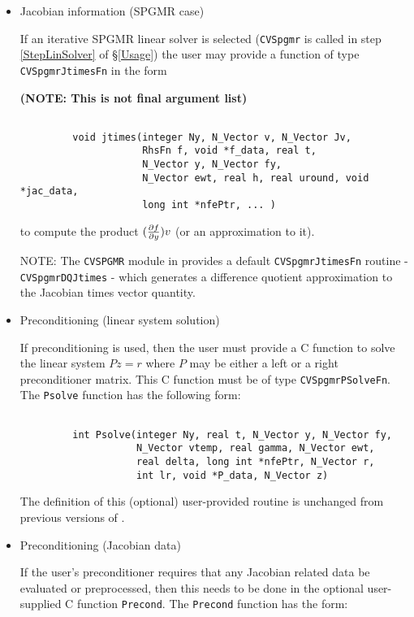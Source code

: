 \begin{itemize}
\item Jacobian information (SPGMR case)

If an iterative SPGMR linear solver is selected ({\tt CVSpgmr} is called in step 
\ref{StepLinSolver} of \S\ref{Usage}) the user may provide a function
of type {\tt CVSpgmrJtimesFn} in the form 

{\bf (NOTE: This is not final argument list)}

\begin{verbatim}

         void jtimes(integer Ny, N_Vector v, N_Vector Jv,
                     RhsFn f, void *f_data, real t, 
                     N_Vector y, N_Vector fy,
                     N_Vector ewt, real h, real uround, void *jac_data,
                     long int *nfePtr, ... )

\end{verbatim} 
to compute the product $(\frac{\partial f}{\partial y}) v$ (or an approximation to it).

NOTE: The {\tt CVSPGMR} module in {\codeS} provides a default 
{\tt CVSpgmrJtimesFn} routine - {\tt CVSpgmrDQJtimes} - which generates a
difference quotient approximation to the Jacobian times vector quantity.

\item Preconditioning (linear system solution) 

If preconditioning is used, then the user must provide a C function to
solve the linear system $Pz = r$ where $P$ may be either a left or a
right preconditioner matrix.
This C function must be of type {\tt CVSpgmrPSolveFn}.
The {\tt Psolve} function has the following form:
\begin{verbatim}

         int Psolve(integer Ny, real t, N_Vector y, N_Vector fy, 
                    N_Vector vtemp, real gamma, N_Vector ewt, 
                    real delta, long int *nfePtr, N_Vector r, 
                    int lr, void *P_data, N_Vector z)

\end{verbatim}

The definition of this (optional) user-provided routine is unchanged from
previous versions of {\code}.

\item Preconditioning (Jacobian data) 

If the user's preconditioner requires that any Jacobian related data
be evaluated or preprocessed, then this needs to be done in the
optional user-supplied C function {\tt Precond}.
The {\tt Precond} function has the form:
\begin{verbatim}


\end{verbatim}
\end{itemize}
